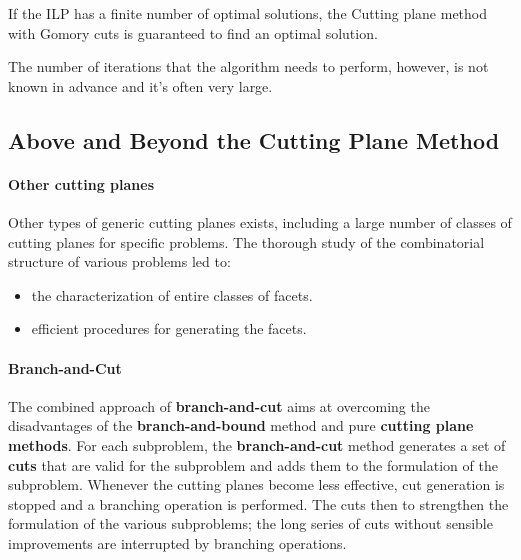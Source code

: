 \begin{theorem}
    If the ILP has a finite number of optimal solutions, the Cutting plane method with Gomory cuts is guaranteed to find an optimal solution.
\end{theorem}
The number of iterations that the algorithm needs to perform, however, is not known in advance and it's often very large.

\subsection{Above and Beyond the Cutting Plane Method}
\paragraph*{Other cutting planes}
Other types of generic cutting planes exists, including a large number of classes of cutting planes for specific problems.
The thorough study of the combinatorial structure of various problems led to:
\begin{itemize}
    \item the characterization of entire classes of facets.
    \item efficient procedures for generating the facets.
\end{itemize}

\paragraph*{Branch-and-Cut}
The combined approach of \textbf{branch-and-cut} aims at overcoming the disadvantages of the \textbf{branch-and-bound} method and pure \textbf{cutting plane methods}.
For each subproblem, the \textbf{branch-and-cut} method generates a set of \textbf{cuts} that are valid for the subproblem and adds them to the formulation of the subproblem.
Whenever the cutting planes become less effective, cut generation is stopped and a branching operation is performed.
The cuts then to strengthen the formulation of the various subproblems; the long series of cuts without sensible improvements are interrupted by branching operations.
